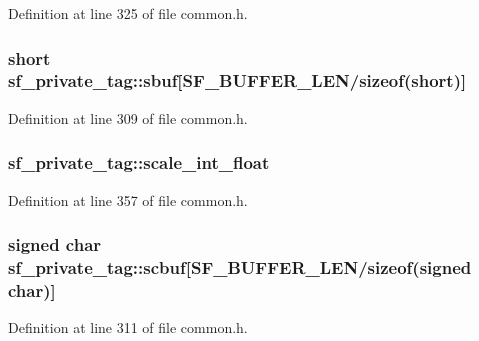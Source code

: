 Definition at line 325 of file common.\+h.

\subsubsection[{\texorpdfstring{sbuf}{sbuf}}]{\setlength{\rightskip}{0pt plus 5cm}short sf\+\_\+private\+\_\+tag\+::sbuf\mbox{[}{\bf S\+F\+\_\+\+B\+U\+F\+F\+E\+R\+\_\+\+L\+EN}/sizeof(short)\mbox{]}}\hypertarget{structsf__private__tag_a2e578a3c7adad2f0a91f75e3a7b74b2d}{}\label{structsf__private__tag_a2e578a3c7adad2f0a91f75e3a7b74b2d}


Definition at line 309 of file common.\+h.

\subsubsection[{\texorpdfstring{scale\+\_\+int\+\_\+float}{scale_int_float}}]{ sf\+\_\+private\+\_\+tag\+::scale\+\_\+int\+\_\+float}\hypertarget{structsf__private__tag_a3590330f6162a114ecab23d31d4a8811}{}\label{structsf__private__tag_a3590330f6162a114ecab23d31d4a8811}


Definition at line 357 of file common.\+h.

\subsubsection[{\texorpdfstring{scbuf}{scbuf}}]{\setlength{\rightskip}{0pt plus 5cm}signed char sf\+\_\+private\+\_\+tag\+::scbuf\mbox{[}{\bf S\+F\+\_\+\+B\+U\+F\+F\+E\+R\+\_\+\+L\+EN}/sizeof(signed char)\mbox{]}}\hypertarget{structsf__private__tag_a832e7cf5ced9bcdb920a59425eb3aee9}{}\label{structsf__private__tag_a832e7cf5ced9bcdb920a59425eb3aee9}


Definition at line 311 of file common.\+h.

